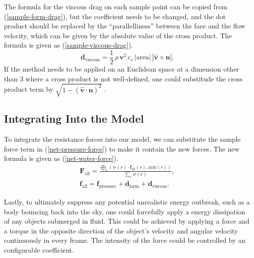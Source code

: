The formula for the viscous drag on each sample point can be copied from (\ref{sample-form-drag}), but the coefficient needs to be changed, and the dot product should be replaced by the ``parallelliness'' between the face and the flow velocity, which can be given by the absolute value of the cross product.
The formula is given as (\ref{sample-viscous-drag}).
\begin{equation}
	\mathbf{d}_{\text{viscous}}=\frac{1}{2}\,\rho\,\mathbf{v}^2\,c_v\,|\text{area}|\,|\hat{\mathbf{v}}\times\mathbf{n}|.
	\label{sample-viscous-drag}
\end{equation}
If the method needs to be applied on an Euclidean space at a dimension other than 3 where a cross product is not well-defined, one could substitude the cross product term by $\sqrt{1-(\hat{\mathbf{v}}\cdot\mathbf{n})^2}$ \cite{blinn2003lines}.

\subsection{Integrating Into the Model}

To integrate the resistance forces into our model, we can substitute the sample force term in (\ref{net-pressure-force}) to make it contain the new forces.
The new formula is given as (\ref{net-water-force}).
\begin{equation}\begin{split}
	\mathbf{F}_{\text{all}}=\frac
		{
			\bigoplus_{s}
			\left(
				w(s)\cdot\mathbf{f}_{\text{all}}(s)
				,
				\text{arm}(s)
			\right)
		}
		{\sum_{s}w(s)},
	\\
	\mathbf{f}_{\text{all}}=\mathbf{f}_{\text{pressure}}+\mathbf{d}_{\text{form}}+\mathbf{d}_{\text{viscous}}.
	\label{net-water-force}
\end{split}\end{equation}

Lastly, to ultimately suppress any potential unrealistic energy outbreak, such as a body bouncing back into the sky, one could forcefully apply a energy dissipation of any objects submerged in fluid.
This could be achieved by applying a force and a torque in the opposite direction of the object's velocity and angular velocity continuously in every frame.
The intensity of the force could be controlled by an configurable coefficient.